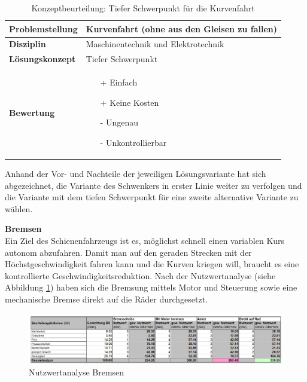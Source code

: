 \documentclass[../../main.tex]{subfiles}
\begin{document}
    \begin{flushleft}
        \begin{table}[h]
        \begin{tabular}{ | l | p{11cm} |}
        \hline
        \textbf{Problemstellung} & Kurvenfahrt (ohne aus den Gleisen zu fallen) \\ \hline
        \textbf{Disziplin} & Maschinentechnik und Elektrotechnik \\ \hline
        \textbf{Lösungskonzept} & Tiefer Schwerpunkt \\ \hline
        \textbf{Bewertung} &  \begin{itemize}
                                \item[+] Einfach
                                \item[+] Keine Kosten
                                \item[-] Ungenau 
                                \item[-] Unkontrollierbar 
                              \end{itemize} \\ \hline
        \end{tabular}
        \caption{Konzeptbeurteilung: Tiefer Schwerpunkt für die Kurvenfahrt}
        \label{tab:tieferschwerpunkt}
    \end{table}
    \end{flushleft}

    Anhand der Vor- und Nachteile der jeweiligen Lösungsvariante hat sich abgezeichnet, die Variante des Schwenkers in erster Linie weiter zu verfolgen und die Variante mit dem tiefen Schwerpunkt für eine zweite alternative Variante zu wählen.
    
    \textbf{Bremsen}\\
    Ein Ziel des Schienenfahrzeugs ist es, möglichst schnell einen variablen Kurs autonom abzufahren. Damit man auf den geraden Strecken mit der Höchstgeschwindigkeit fahren kann und die Kurven kriegen will, braucht es eine kontrollierte Geschwindigkeitsreduktion. Nach der Nutzwertanalyse (siehe Abbildung \ref{fig:bremsen}) haben sich die Bremsung mittels Motor und Steuerung sowie eine mechanische Bremse direkt auf die Räder durchgesetzt.

    \begin{figure}[H] %
        \centering
        \includegraphics[width=1\textwidth]{Bremsen}
        \caption{Nutzwertanalyse Bremsen}
        \label{fig:bremsen}
    \end{figure}
\end{document}
